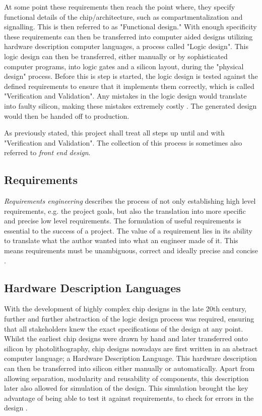 At some point these requirements then reach the point where, they specify functional details of the chip/architecture, such as compartmentalization and signalling. This is then referred to as "Functional design." With enough specificity these requirements can then be transferred into computer aided designs utilizing hardware description computer languages, a process called "Logic design". This logic design can then be transferred, either manually or by sophisticated computer programs, into logic gates and a silicon layout, during the "physical design"  process. Before this is step is started, the logic design is tested against the defined requirements to ensure that it implements them correctly, which is called "Verification and Validation". Any mistakes in the logic design would translate into faulty silicon, making these mistakes extremely costly \cite{chipdesignflow1} \cite{chipdesignflow2}. The generated design would then be handed off to production.

As previously stated, this project shall treat all steps up until and with "Verification and Validation". The collection of this process is sometimes also referred to \textit{front end design}.

\subsection{Requirements}
\textit{Requirements engineering} describes the process of not only establishing high level requirements, e.g. the project goals, but also the translation into more specific and precise low level requirements. The formulation of useful requirements is essential to the success of a project. The value of a requirement lies in its ability to translate what the author wanted into what an engineer made of it. This means requirements must be unambiguous, correct and ideally precise and concise \cite{requirementsengineering}.

\subsection{Hardware Description Languages}
With the development of highly complex chip designs in the late 20th century, further and further abstraction of the logic design process was required, ensuring that all stakeholders knew the exact specifications of the design at any point. Whilst the earliest chip designs were drawn by hand and later transferred onto silicon by photolithography, chip designs nowadays are first written in an abstract computer language; a Hardware Description Language. This hardware description can then be transferred into silicon either manually or automatically.  Apart from allowing separation, modularity and reusability of components, this description later also allowed for simulation of the design. This simulation brought the key advantage of being able to test it against requirements, to check for errors in the design \cite{histverilog} \cite{1214355}.


